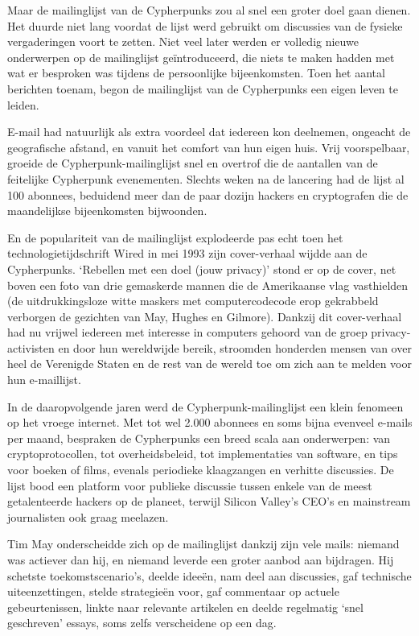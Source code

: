 \documentclass[
  a5paper,
  smalldemyvopaper,11pt,twoside,onecolumn,openright,extrafontsizes,
hidelinks]{memoir}
\begin{document}
Maar de mailinglijst van de Cypherpunks zou al snel een groter doel gaan
dienen. Het duurde niet lang voordat de lijst werd gebruikt om
discussies van de fysieke vergaderingen voort te zetten. Niet veel later
werden er volledig nieuwe onderwerpen op de mailinglijst geïntroduceerd,
die niets te maken hadden met wat er besproken was tijdens de
persoonlijke bijeenkomsten. Toen het aantal berichten toenam, begon de
mailinglijst van de Cypherpunks een eigen leven te leiden.

E-mail had natuurlijk als extra voordeel dat iedereen kon deelnemen,
ongeacht de geografische afstand, en vanuit het comfort van hun eigen
huis. Vrij voorspelbaar, groeide de Cypherpunk-mailinglijst snel en
overtrof die de aantallen van de feitelijke Cypherpunk evenementen.
Slechts weken na de lancering had de lijst al 100 abonnees, beduidend
meer dan de paar dozijn hackers en cryptografen die de maandelijkse
bijeenkomsten bijwoonden.

En de populariteit van de mailinglijst explodeerde pas echt toen het
technologietijdschrift Wired in mei 1993 zijn cover-verhaal wijdde aan
de Cypherpunks. `Rebellen met een doel (jouw privacy)' stond er op de
cover, net boven een foto van drie gemaskerde mannen die de Amerikaanse
vlag vasthielden (de uitdrukkingsloze witte maskers met computercodecode
erop gekrabbeld verborgen de gezichten van May, Hughes en Gilmore).
Dankzij dit cover-verhaal had nu vrijwel iedereen met interesse in
computers gehoord van de groep privacy-activisten en door hun
wereldwijde bereik, stroomden honderden mensen van over heel de
Verenigde Staten en de rest van de wereld toe om zich aan te melden voor
hun e-maillijst.

In de daaropvolgende jaren werd de Cypherpunk-mailinglijst een klein
fenomeen op het vroege internet. Met tot wel 2.000 abonnees en soms
bijna evenveel e-mails per maand, bespraken de Cypherpunks een breed
scala aan onderwerpen: van cryptoprotocollen, tot overheidsbeleid, tot
implementaties van software, en tips voor boeken of films, evenals
periodieke klaagzangen en verhitte discussies. De lijst bood een
platform voor publieke discussie tussen enkele van de meest
getalenteerde hackers op de planeet, terwijl Silicon Valley's CEO's en
mainstream journalisten ook graag meelazen.

Tim May onderscheidde zich op de mailinglijst dankzij zijn vele mails:
niemand was actiever dan hij, en niemand leverde een groter aanbod aan
bijdragen. Hij schetste toekomstscenario's, deelde ideeën, nam deel aan
discussies, gaf technische uiteenzettingen, stelde strategieën voor, gaf
commentaar op actuele gebeurtenissen, linkte naar relevante artikelen en
deelde regelmatig `snel geschreven' essays, soms zelfs verscheidene op
een dag.
\end{document}

